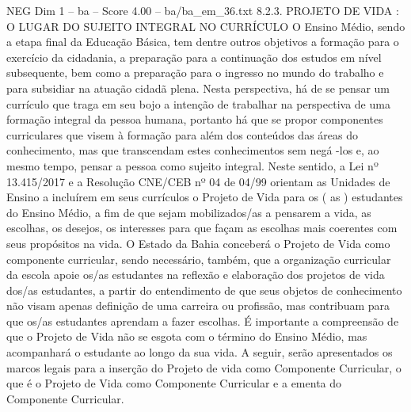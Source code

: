 \begin{textsample}{NEG Dim 1 – ba – Score 4.00 – ba/ba\_em\_36.txt}  \label{ex:f1_neg_187}
8.2.3.
PROJETO DE VIDA : O LUGAR DO SUJEITO INTEGRAL NO CURRÍCULO O Ensino Médio, sendo a etapa final da Educação Básica, tem dentre outros objetivos a formação para o exercício da cidadania, a preparação para a continuação dos estudos em nível subsequente, bem como a preparação para o ingresso no mundo do trabalho e para subsidiar na atuação cidadã plena.
Nesta perspectiva, há de se pensar um currículo que traga em seu bojo a intenção de trabalhar na perspectiva de uma formação integral da pessoa humana, portanto há que se propor componentes curriculares que visem à formação para além dos conteúdos das áreas do conhecimento, mas que transcendam estes conhecimentos sem negá -los e, ao mesmo tempo, pensar a pessoa como sujeito integral.
Neste sentido, a Lei nº 13.415/2017 e a Resolução CNE/CEB nº 04 de 04/99 orientam as Unidades de Ensino a incluírem em seus currículos o Projeto de Vida para os ( as ) estudantes do Ensino Médio, a fim de que sejam mobilizados/as a pensarem a vida, as escolhas, os desejos, os interesses para que façam as escolhas mais coerentes com seus propósitos na vida.
O Estado da Bahia conceberá o Projeto de Vida como componente curricular, sendo necessário, também, que a organização curricular da escola apoie os/as estudantes na reflexão e elaboração dos projetos de vida dos/as estudantes, a partir do entendimento de que seus objetos de conhecimento não visam apenas definição de uma carreira ou profissão, mas contribuam para que os/as estudantes aprendam a fazer escolhas.
É importante a compreensão de que o Projeto de Vida não se esgota com o término do Ensino Médio, mas acompanhará o estudante ao longo da sua vida.
A seguir, serão apresentados os marcos legais para a inserção do Projeto de vida como Componente Curricular, o que é o Projeto de Vida como Componente Curricular e a ementa do Componente Curricular.

\end{textsample}
